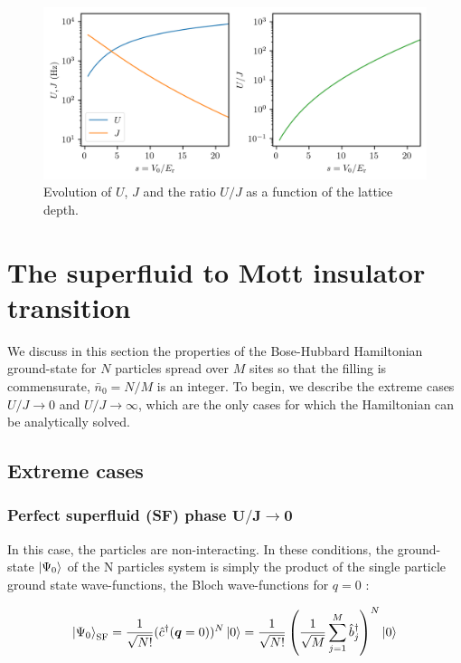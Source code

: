 \begin{figure}
    \centering
    \includegraphics[width=\textwidth]{Fig/Chapter2/U_J_vs_s.png}
    \caption{Evolution of $U$, $J$ and the ratio $U/J$ as a function of the lattice depth.}
    \label{fig:U_J_vs_s}
\end{figure}

\section{The superfluid to Mott insulator transition}

We discuss in this section the properties of the Bose-Hubbard Hamiltonian ground-state for $N$ particles spread over $M$ sites so that the filling is commensurate, \ie $\bar{n}_0=N/M$ is an integer. To begin, we describe the extreme cases $U/J \to 0$ and $U/J \to \infty$, which are the only cases for which the Hamiltonian can be analytically solved. 

\subsection{Extreme cases}

\subsubsection{Perfect superfluid (SF) phase $\bm{U/J \to 0}$}

In this case, the particles are non-interacting. In these conditions, the ground-state $\ket{\Psi_0}$ of the N particles system is simply the product of the single particle ground state wave-functions, \ie the Bloch wave-functions for $q=0$ \cite{bloch2008many}:

\begin{equation}
    \ket{\Psi_0}_{\mathrm{SF}} = \frac{1}{\sqrt{N!}} (\hat{c}^{\dagger}(\bm{q}=0))^N \ket{0} = \frac{1}{\sqrt{N !}}\left(\frac{1}{\sqrt{M}} \sum_{j=1}^{M} \hat{b}_{j}^{\dagger}\right)^{N} \ket{0}
\end{equation}

